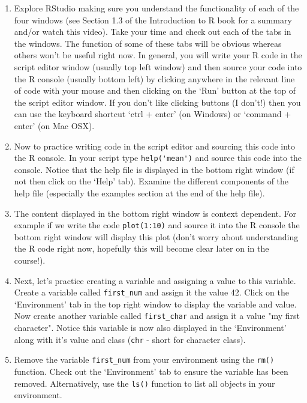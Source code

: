 \documentclass[12pt]{article}
\begin{document}
\begin{enumerate}
 

\item Explore RStudio making sure you understand the functionality of each of the four windows (see Section 1.3 of the Introduction to R book for a summary and/or watch this video). Take your time and check out each of the tabs in the windows. The function of some of these tabs will be obvious whereas others won’t be useful right now. In general, you will write your R code in the script editor window (usually top left window) and then source your code into the R console (usually bottom left) by clicking anywhere in the relevant line of code with your mouse and then clicking on the ‘Run’ button at the top of the script editor window. If you don’t like clicking buttons (I don’t!) then you can use the keyboard shortcut ‘ctrl + enter’ (on Windows) or ‘command + enter’ (on Mac OSX).

 

\item Now to practice writing code in the script editor and sourcing this code into the R console. 
 In your script type \lstinline{help('mean')} and source this code into the console. Notice that the help file is displayed in the bottom right window (if not then click on the ‘Help’ tab). Examine the different components of the help file (especially the examples section at the end of the help file). 
 

 

\item The content displayed in the bottom right window is context dependent. For example if we write the code \lstinline{plot(1:10)} and source it into the R console the bottom right window will display this plot (don’t worry about understanding the R code right now, hopefully this will become clear later on in the course!).

 

\item Next, let’s practice creating a variable and assigning a value to this variable. 
Create a variable called \verb|first_num| and assign it the value 42. Click on the ‘Environment’ tab in the top right window to display the variable and value. Now create another variable called \verb|first_char| and assign it a value "my first character". Notice this variable is now also displayed in the ‘Environment’ along with it’s value and class (\verb|chr| - short for character class).

 

\item Remove the variable \verb|first_num| from your environment using the \verb|rm()| function. Check out the ‘Environment’ tab to ensure the variable has been removed. Alternatively, use the \verb|ls()| function to list all objects in your environment.


\end{enumerate}
\end{document}
